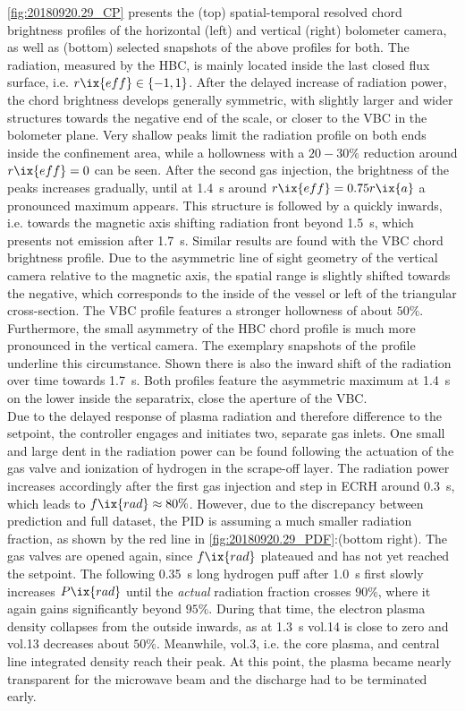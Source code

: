 %
            \autoref{fig:20180920.29_CP} presents the (top) spatial-temporal resolved chord brightness profiles of the horizontal (left) and vertical (right) bolometer camera, as well as (bottom) selected snapshots of the above profiles for both. The radiation, measured by the HBC, is mainly located inside the last closed flux surface, i.e. $r\ix{eff}\in\left\{-1, 1\right\}$. After the delayed increase of radiation power, the chord brightness develops generally symmetric, with slightly larger and wider structures towards the negative end of the scale, or closer to the VBC in the bolometer plane. Very shallow peaks limit the radiation profile on both ends inside the confinement area, while a hollowness with a $20-30\%$ reduction around $r\ix{eff}=0$ can be seen. After the second gas injection, the brightness of the peaks increases gradually, until at \SI{1.4}{\second} around $r\ix{eff}=0.75r\ix{a}$ a pronounced maximum appears. This structure is followed by a quickly inwards, i.e. towards the magnetic axis shifting radiation front beyond \SI{1.5}{\second}, which presents not emission after \SI{1.7}{\second}. Similar results are found with the VBC chord brightness profile. Due to the asymmetric line of sight geometry of the vertical camera relative to the magnetic axis, the spatial range is slightly shifted towards the negative, which corresponds to the inside of the vessel or left of the triangular cross-section. The VBC profile features a stronger hollowness of about $50\%$. Furthermore, the small asymmetry of the HBC chord profile is much more pronounced in the vertical camera. The exemplary snapshots of the profile underline this circumstance. Shown there is also the inward shift of the radiation over time towards \SI{1.7}{\second}. Both profiles feature the asymmetric maximum at \SI{1.4}{\second} on the lower inside the separatrix, close the aperture of the VBC.\\%
            Due to the delayed response of plasma radiation and therefore difference to the setpoint, the controller engages and initiates two, separate gas inlets. One small and large dent in the radiation power can be found following the actuation of the gas valve and ionization of hydrogen in the scrape-off layer. The radiation power increases accordingly after the first gas injection and step in ECRH around \SI{0.3}{\second}, which leads to $f\ix{rad}\approx 80\%$. However, due to the discrepancy between prediction and full dataset, the PID is assuming a much smaller radiation fraction, as shown by the red line in \cref{fig:20180920.29_PDF}:(bottom right). The gas valves are opened again, since $f\ix{rad}$ plateaued and has not yet reached the setpoint. The following \SI{0.35}{\second} long hydrogen puff after \SI{1.0}{\second} first slowly increases $P\ix{rad}$ until the \textit{actual} radiation fraction crosses $90\%$, where it again gains significantly beyond $95\%$. During that time, the electron plasma density collapses from the outside inwards, as at \SI{1.3}{\second} vol.14 is close to zero and vol.13 decreases about $50\%$. Meanwhile, vol.3, i.e. the core plasma, and central line integrated density reach their peak. At this point, the plasma became nearly transparent for the microwave beam and the discharge had to be terminated early.\\%
